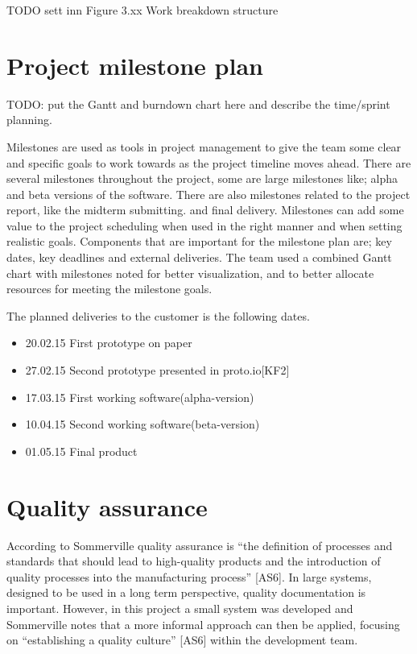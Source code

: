 TODO sett inn Figure 3.xx Work breakdown structure\newline

\section{Project milestone plan}

TODO: put the Gantt and burndown chart here and describe the time/sprint planning.\newline

Milestones are used as tools in project management to give the team some clear and specific goals to work towards as the project timeline moves ahead. There are several milestones throughout the project, some are large milestones like; alpha and beta versions of the software. There are also milestones related to the project report, like the midterm submitting. and final delivery. Milestones can add some value to the project scheduling when used in the right manner and when setting realistic goals. Components that are important for the milestone plan are; key dates, key deadlines and external deliveries.  The team used a combined Gantt chart with milestones noted for better visualization, and to better allocate resources for meeting the milestone goals.\newline

The planned deliveries to the customer is the following dates. 
\begin{itemize}
\item 20.02.15 First prototype on paper
\item 27.02.15 Second prototype presented in proto.io[KF2]
\item 17.03.15 First working software(alpha-version)
\item 10.04.15 Second working software(beta-version) 
\item 01.05.15 Final product
\end{itemize}

\section{Quality assurance}

According to Sommerville quality assurance is “the definition of processes and standards that should lead to high-quality products and the introduction of quality processes into the manufacturing process” [AS6]. In large systems, designed to be used in a long term perspective, quality documentation is important. However, in this project a small system was developed and Sommerville notes that a more informal approach can then be applied, focusing on “establishing a quality culture” [AS6] within the development team.\newline

